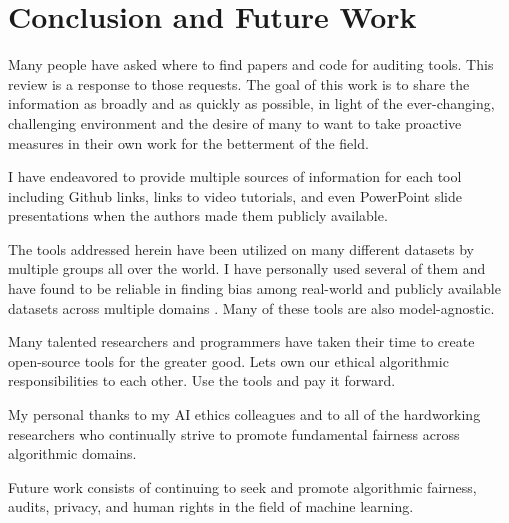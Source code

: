 \documentclass[conference]{IEEEtran}
\begin{document}
\section{Conclusion and Future Work}
Many people have asked where to find papers and code for auditing tools. This review is a response to those requests.
The goal of this work is to share the information as broadly and as quickly as possible, in light of the ever-changing, challenging environment and the desire of many to want to take proactive measures in their own work for the betterment of the field.

I have endeavored to provide multiple sources of information for each tool including Github links, links to video tutorials, and even PowerPoint slide presentations when the authors made them publicly available.

The tools addressed herein have been utilized on many different datasets by multiple groups all over the world. I have personally used several of them and have found to be reliable in finding bias among real-world and publicly available datasets across multiple domains \cite{b74}. Many of these tools are also model-agnostic.

Many talented researchers and programmers have taken their time to create open-source tools for the greater good. Lets own our ethical algorithmic responsibilities to each other.
Use the tools and pay it forward.

My personal thanks to my AI ethics colleagues and to all of the hardworking researchers who continually strive to promote fundamental fairness across algorithmic domains.

Future work consists of continuing to seek and promote algorithmic fairness, audits, privacy, and human rights in the field of machine learning.
\end{document}
